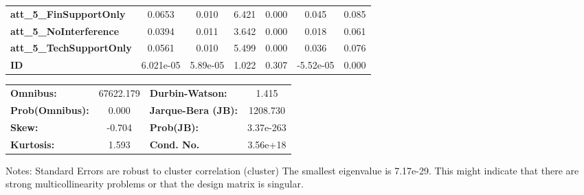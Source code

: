 \begin{center}
\begin{tabular}{lcccccc}
\textbf{att\_5\_FinSupportOnly}      &       0.0653  &        0.010     &     6.421  &         0.000        &        0.045    &        0.085     \\
\textbf{att\_5\_NoInterference}      &       0.0394  &        0.011     &     3.642  &         0.000        &        0.018    &        0.061     \\
\textbf{att\_5\_TechSupportOnly}     &       0.0561  &        0.010     &     5.499  &         0.000        &        0.036    &        0.076     \\
\textbf{ID}                          &    6.021e-05  &     5.89e-05     &     1.022  &         0.307        &    -5.52e-05    &        0.000     \\
\bottomrule
\end{tabular}
\begin{tabular}{lclc}
\textbf{Omnibus:}       & 67622.179 & \textbf{  Durbin-Watson:     } &     1.415  \\
\textbf{Prob(Omnibus):} &    0.000  & \textbf{  Jarque-Bera (JB):  } &  1208.730  \\
\textbf{Skew:}          &   -0.704  & \textbf{  Prob(JB):          } & 3.37e-263  \\
\textbf{Kurtosis:}      &    1.593  & \textbf{  Cond. No.          } &  3.56e+18  \\
\bottomrule
\end{tabular}
\end{center}

Notes: \newline
 [1] Standard Errors are robust to cluster correlation (cluster) \newline
 [2] The smallest eigenvalue is 7.17e-29. This might indicate that there are \newline
 strong multicollinearity problems or that the design matrix is singular.